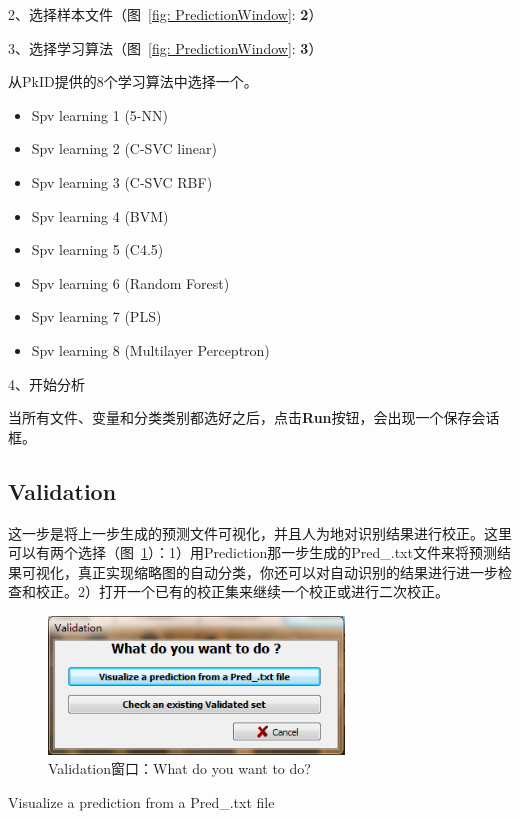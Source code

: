 \documentclass[12pt]{article}
\begin{document}
2、选择样本文件（图~\ref{fig: PredictionWindow}: {\color{red}\textbf{2}}）

3、选择学习算法（图~\ref{fig: PredictionWindow}: {\color{red}\textbf{3}}）

从PkID提供的8个学习算法中选择一个。
\begin{itemize}
\item Spv learning 1 (5-NN)
\item Spv learning 2 (C-SVC linear)
\item Spv learning 3 (C-SVC RBF)
\item Spv learning 4 (BVM)
\item Spv learning 5 (C4.5)
\item Spv learning 6 (Random Forest)
\item Spv learning 7 (PLS)
\item Spv learning 8 (Multilayer Perceptron)
\end{itemize}

4、开始分析

当所有文件、变量和分类类别都选好之后，点击\textbf{Run}按钮，会出现一个保存会话框。

\subsection{Validation}

这一步是将上一步生成的预测文件可视化，并且人为地对识别结果进行校正。这里可以有两个选择（图~\ref{fig: ValidationWindow}）：1）用Prediction那一步生成的Pred\_.txt文件来将预测结果可视化，真正实现缩略图的自动分类，你还可以对自动识别的结果进行进一步检查和校正。2）打开一个已有的校正集来继续一个校正或进行二次校正。

\begin{figure}[!ht]
\centering
\includegraphics[width=0.7\textwidth]{ValidationWindow.png}
\caption{Validation窗口：What do you want to do?}
\label{fig: ValidationWindow}
\end{figure}

{\color{red}Visualize a prediction from a Pred\_.txt file}
\end{document}
